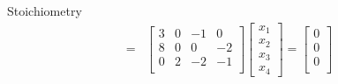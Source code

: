 \documentclass{beamer}
\begin{document}
\begin{frame}{Stoichiometry}
{\begin{align*}
=
&\begin{bmatrix}
    3 & 0 & -1 & 0 \\
    8 & 0 & 0 & -2 \\
    0 & 2 & -2 & -1 \\
\end{bmatrix}
\begin{bmatrix}
    x_1 \\
    x_2 \\
    x_3 \\
    x_4 
\end{bmatrix}
= \begin{bmatrix}
    \text{0} \\
    \text{0} \\
    \text{0} \\
\end{bmatrix} \\
\end{align*}
}
\end{frame}
\end{document}

